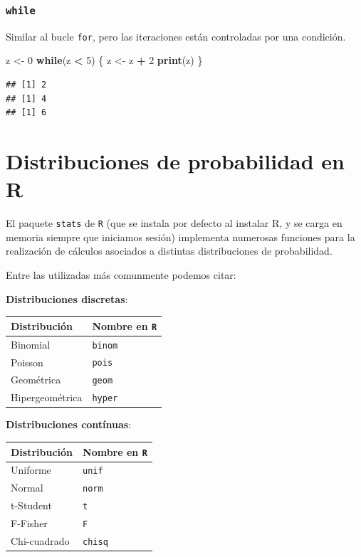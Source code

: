 \documentclass[]{book}
\newenvironment{Shaded}{\begin{snugshade}}{\end{snugshade}}
\newcommand{\KeywordTok}[1]{\textcolor[rgb]{0.13,0.29,0.53}{\textbf{#1}}}
\newcommand{\DecValTok}[1]{\textcolor[rgb]{0.00,0.00,0.81}{#1}}
\newcommand{\StringTok}[1]{\textcolor[rgb]{0.31,0.60,0.02}{#1}}
\newcommand{\ControlFlowTok}[1]{\textcolor[rgb]{0.13,0.29,0.53}{\textbf{#1}}}
\newcommand{\OperatorTok}[1]{\textcolor[rgb]{0.81,0.36,0.00}{\textbf{#1}}}
\newcommand{\NormalTok}[1]{#1}
\begin{document}
\subsection{\texorpdfstring{\texttt{while}}{while}}\label{while}

Similar al bucle \texttt{for}, pero las iteraciones están controladas
por una condición.

\begin{Shaded}
\begin{Highlighting}[]
\NormalTok{z <-}\StringTok{ }\DecValTok{0}
\ControlFlowTok{while}\NormalTok{(z }\OperatorTok{<}\StringTok{ }\DecValTok{5}\NormalTok{) \{}
\NormalTok{    z <-}\StringTok{ }\NormalTok{z }\OperatorTok{+}\StringTok{ }\DecValTok{2}
    \KeywordTok{print}\NormalTok{(z) }
\NormalTok{\}}
\end{Highlighting}
\end{Shaded}

\begin{verbatim}
## [1] 2
## [1] 4
## [1] 6
\end{verbatim}

\chapter{Distribuciones de probabilidad en
R}\label{distribuciones-de-probabilidad-en-r}

El paquete \texttt{stats} de \texttt{R} (que se instala por defecto al
instalar R, y se carga en memoria siempre que iniciamos sesión)
implementa numerosas funciones para la realización de cálculos asociados
a distintas distribuciones de probabilidad.

Entre las utilizadas más comunmente podemos citar:

\textbf{Distribuciones discretas}:

\begin{longtable}[]{@{}ll@{}}
\toprule
Distribución & Nombre en \texttt{R}\tabularnewline
\midrule
\endhead
Binomial & \texttt{binom}\tabularnewline
Poisson & \texttt{pois}\tabularnewline
Geométrica & \texttt{geom}\tabularnewline
Hipergeométrica & \texttt{hyper}\tabularnewline
\bottomrule
\end{longtable}

\textbf{Distribuciones contínuas}:

\begin{longtable}[]{@{}ll@{}}
\toprule
Distribución & Nombre en \texttt{R}\tabularnewline
\midrule
\endhead
Uniforme & \texttt{unif}\tabularnewline
Normal & \texttt{norm}\tabularnewline
t-Student & \texttt{t}\tabularnewline
F-Fisher & \texttt{F}\tabularnewline
Chi-cuadrado & \texttt{chisq}\tabularnewline
\bottomrule
\end{longtable}
\end{document}
